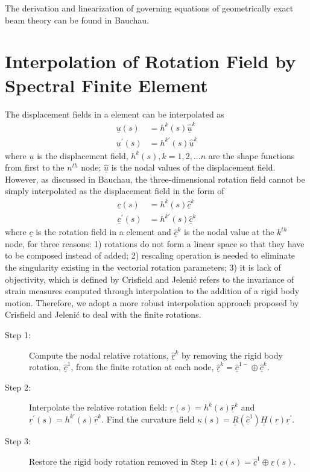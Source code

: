 \documentclass{aiaa-tc}
\newcommand{\tens}[1]{\underline{\underline{#1}}}
\renewcommand{\vec}[1]{\underline{#1}}
\begin{document}
The derivation and linearization of governing equations of geometrically exact beam theory can be found in Bauchau\cite{Bauchau:2010}.

\section{Interpolation of Rotation Field by Spectral Finite Element}
The displacement fields in a element can be interpolated as
\begin{align}
    \label{InterpolateDisp}
    \vec{u}(s) &= h^k(s) \vec{\hat{u}}^k \\
    \label{InterpolateDispp}
    \vec{u}^\prime(s) &= h^{k\prime}(s) \vec{\hat{u}}^k
\end{align}
where $\vec{u}$ is the displacement field, $h^k(s), k=1,2,...n$ are the
shape functions from first to the $n^{th}$ node; $\vec{\hat{u}}$ is the
nodal values of the displacement field. However, as discussed in
Bauchau\cite{Bauchau:2010}, the three-dimensional rotation field cannot be
simply interpolated as the displacement field in the form of
\begin{align}
    \label{InterpolateRot}
    \vec{c}(s) &= h^k(s) \vec{\hat{c}}^k \\
    \label{InterpolateRotp}
    \vec{c}^\prime(s) &= h^{k \prime}(s) \vec{\hat{c}}^k 
\end{align}    
where $\vec{c}$ is the rotation field in a element and $\vec{\hat{c}}^k$ is
the nodal value at the $k^{th}$ node, for three reasons: 1) rotations do not
form a linear space so that they have to be composed instead of added; 2)
rescaling operation is needed to eliminate the singularity existing in the
vectorial rotation parameters; 3) it is lack of objectivity, which is
defined by Crisfield and Jeleni\'c\cite{Crisfield1999} refers
to the invariance of strain measures computed through interpolation to the
addition of a rigid body motion. Therefore, we adopt a more robust
interpolation approach proposed by Crisfield and Jeleni\'c
\cite{Crisfield1999} to deal with the finite rotations.
\begin{description}
    \item[Step 1:] Compute the nodal relative rotations, $\vec{\hat{r}}^k$ by removing the rigid body rotation, $\vec{\hat{c}}^1$, from the finite rotation at each node, $\vec{\hat{r}}^k = \vec{\hat{c}}^{1-} \oplus \vec{\hat{c}}^k$.
    \item[Step 2:] Interpolate the relative rotation field: $\vec{r}(s) = h^k(s) \vec{\hat{r}}^k$ and $\vec{r}^\prime(s) = h^{k \prime}(s) \vec{\hat{r}}^k$. Find the curvature field $\vec{\kappa}(s) = \tens{R}(\vec{\hat{c}}^1) \tens{H}(\vec{r}) \vec{r}^\prime$.
    \item[Step 3:] Restore the rigid body rotation removed in Step 1: $\vec{c}(s) = \vec{\hat{c}}^1 \oplus \vec{r}(s)$.
\end{description} 
\end{document}
